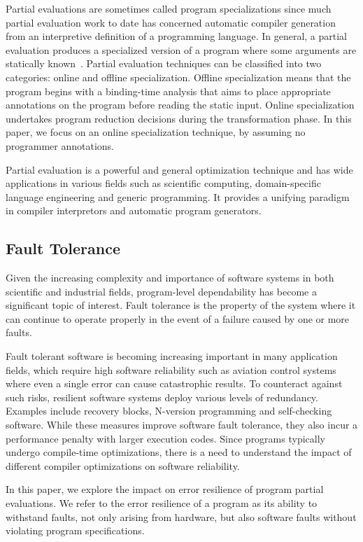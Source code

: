 Partial evaluations are sometimes called program specializations since much partial evaluation work to date has concerned automatic compiler generation from an interpretive definition of a programming language.
In general, a partial evaluation produces a specialized version of a program where some arguments are statically known~\cite{Jones1996}. 
Partial evaluation techniques can be classified into two categories: online and offline specialization.
Offline specialization means that the program begins with a binding-time analysis that aims to place appropriate annotations on the program before reading the static input.
Online specialization undertakes program reduction decisions during the transformation phase. In this paper, we focus on an online specialization technique, by assuming no programmer annotations. 

Partial evaluation is a powerful and general optimization technique and has wide applications in various fields such as scientific computing, domain-specific language engineering and generic programming.
It provides a unifying paradigm in compiler interpretors and automatic program generators.

\subsection{Fault Tolerance}
\label{sec:fault_tolerance}
Given the increasing complexity and importance of software systems in both scientific and industrial fields, program-level dependability has become a significant topic of interest.
Fault tolerance is the property of the system where it can continue to operate properly in the event of a failure caused by one or more faults.

Fault tolerant software is becoming increasing important in many application fields, which require high software reliability such as aviation control systems where even a single error can cause catastrophic results.
To counteract against such risks, resilient software systems deploy various levels of redundancy.
Examples include recovery blocks, N-version programming and self-checking software.
While these measures improve software fault tolerance, they also incur a performance penalty with larger execution codes.
Since programs typically undergo compile-time optimizations, there is a need to understand the impact of different compiler optimizations on software reliability.

In this paper, we explore the impact on error resilience of program partial evaluations. We refer to the error resilience of a program as its ability to withstand faults, not only arising from hardware, but also software faults without violating program specifications. 

